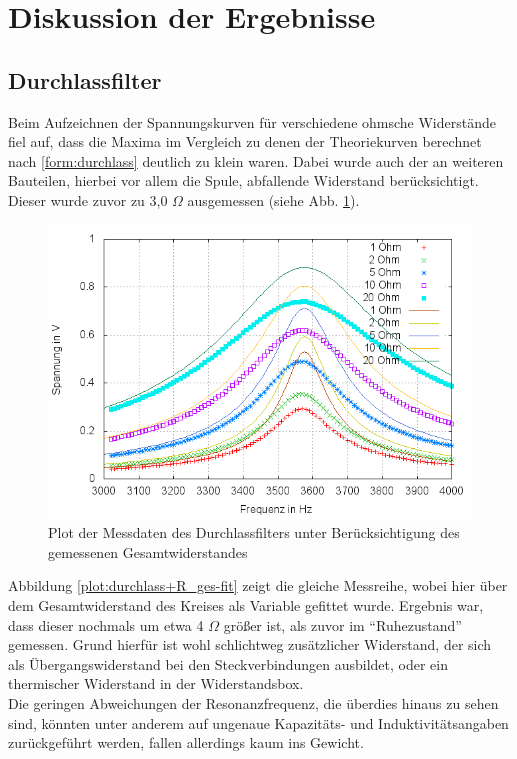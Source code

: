 \section{Diskussion der Ergebnisse}

\subsection{Durchlassfilter}
Beim Aufzeichnen der Spannungskurven für verschiedene ohmsche Widerstände fiel auf, dass die Maxima im Vergleich zu denen der Theoriekurven berechnet nach \eqref{form:durchlass} deutlich zu klein waren. Dabei wurde auch der an weiteren Bauteilen, hierbei vor allem die Spule, abfallende Widerstand berücksichtigt. Dieser wurde zuvor zu 3,0 $  \Omega $ ausgemessen (siehe Abb. \ref{plot:durchlass+R_ges}).
\begin{figure}[h]
        \includegraphics[width=.9\textwidth]{images/plot/durchlassfilter+theorie+R_ges.png}
\caption{Plot der Messdaten des Durchlassfilters unter Berücksichtigung des gemessenen Gesamtwiderstandes}
\label{plot:durchlass+R_ges}
\end{figure}
Abbildung \ref{plot:durchlass+R_ges-fit} zeigt die gleiche Messreihe, wobei hier über dem Gesamtwiderstand des Kreises als Variable gefittet wurde. Ergebnis war, dass dieser nochmals um etwa 4 $  \Omega $ größer ist, als zuvor im \enquote{Ruhezustand} gemessen. Grund hierfür ist wohl schlichtweg zusätzlicher Widerstand, der sich als Übergangswiderstand bei den Steckverbindungen ausbildet, oder ein thermischer Widerstand in der Widerstandsbox.\\
Die geringen Abweichungen der Resonanzfrequenz, die überdies hinaus zu sehen sind, könnten unter anderem auf ungenaue Kapazitäts- und Induktivitätsangaben zurückgeführt werden, fallen allerdings kaum ins Gewicht.


